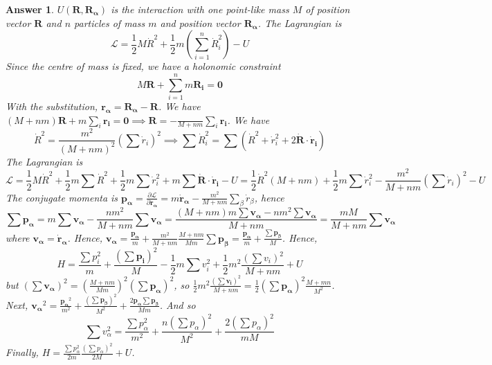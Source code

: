 \documentclass[a4paper]{article}
\newtheorem{ans}{Answer}[subsection]
\theoremstyle{new}
\begin{document}
\begin{ans}
$U(\mathbf{R},\mathbf{R_\alpha})$ is the interaction with one point-like mass $M$ of position vector $\mathbf{R}$ and $n$ particles of mass $m$ and position vector $\mathbf{R_\alpha}$. The Lagrangian is
$$\mathcal{L}=\frac{1}{2}M\dot{R}^2+\frac{1}{2}m(\sum_{i=1}^n\dot{R}_i^2)-U$$
Since the centre of mass is fixed, we have a holonomic constraint
$$M\mathbf{R}+\sum_{i=1}^nm\mathbf{R_i}=\boldsymbol{0}$$
With the substitution, $\mathbf{r_\alpha}=\mathbf{R_\alpha}-\mathbf{R}$. We have $(M+nm)\mathbf{R}+m\sum_i\mathbf{r_i}=\boldsymbol{0}\implies\mathbf{R}=-\frac{}{M+nm}\sum_i\mathbf{r_i}$. We have 
$$\dot{R}^2=\frac{m^2}{(M+nm)^2}(\sum\dot{r}_i)^2\implies\sum\dot{R}_i^2=\sum(\dot{R}^2+\dot{r}_i^2+2\mathbf{\dot{R}}\cdot\mathbf{\dot{r}_i})$$
The Lagrangian is 
$$\mathcal{L}=\frac{1}{2}M\dot{R}^2+\frac{1}{2}m\sum\dot{R}^2+\frac{1}{2}m\sum\dot{r}_i^2+m\sum\mathbf{\dot{R}}\cdot\mathbf{\dot{r}_i}-U=\frac{1}{2}\dot{R}^2(M+nm)+\frac{1}{2}m\sum\dot{r}_i^2-\frac{m^2}{M+nm}(\sum\dot{r}_i)^2-U$$
The conjugate momenta is $\mathbf{p_\alpha}=\frac{\partial\mathcal{L}}{\partial\mathbf{\dot{r}_\alpha}}=m\mathbf{\dot{r}_\alpha}-\frac{m^2}{M+nm}\sum_\beta\dot{r}_\beta$, hence
$$\sum\mathbf{p_\alpha}=m\sum\mathbf{v_\alpha}-\frac{nm^2}{M+nm}\sum\mathbf{v_\alpha}=\frac{(M+nm)m\sum\mathbf{v_\alpha}-nm^2\sum\mathbf{v_\alpha}}{M+nm}=\frac{mM}{M+nm}\sum\mathbf{v_\alpha}$$
where $\mathbf{v_\alpha}=\mathbf{\dot{r}_\alpha}$. Hence, $\mathbf{v_\alpha}=\frac{\mathbf{p_\alpha}}{m}+\frac{m^2}{M+nm}\frac{M+nm}{Mm}\sum\mathbf{p_\beta}=\frac{\mathbf{p_\alpha}}{m}+\frac{\sum\mathbf{p_\beta}}{M}$. Hence,
$$H=\frac{\sum p_i^2}{m}+\frac{(\sum\mathbf{p_i})^2}{M}-\frac{1}{2}m\sum v_i^2+\frac{1}{2}m^2\frac{(\sum v_i)^2}{M+nm}+U$$
but $(\sum\mathbf{v_\alpha})^2=(\frac{M+nm}{Mm})^2(\sum\mathbf{p_\alpha})^2$, so $\frac{1}{2}m^2\frac{(\sum\mathbf{v_i})^2}{M+nm}=\frac{1}{2}(\sum\mathbf{p_\alpha})^2\frac{M+mn}{M^2}$. Next, $\mathbf{v_\alpha}^2=\frac{\mathbf{p_\alpha}^2}{m^2}+\frac{(\sum\mathbf{p_\beta})^2}{M^2}+\frac{2\mathbf{p_\alpha}\sum\mathbf{p_\beta}}{Mm}$. And so 
$$\sum v_\alpha^2=\frac{\sum p_\alpha^2}{m^2}+\frac{n(\sum p_\alpha)^2}{M^2}+\frac{2(\sum p_\alpha)^2}{mM}$$
Finally, $H=\frac{\sum p_\alpha^2}{2m}\frac{(\sum p_\alpha)^2}{2M}+U$.
\end{ans}
\end{document}
